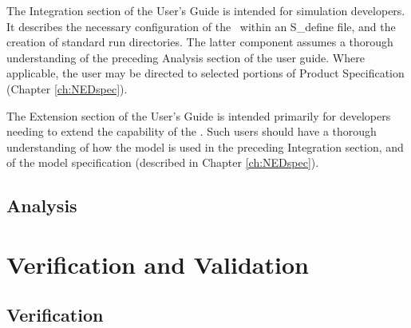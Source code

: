 The Integration section of the User's Guide is intended for simulation
developers.
It describes the necessary configuration of the \NEDDesc\
within an
S\_define file, and the creation of standard run directories.  The
latter
component assumes a thorough understanding of the preceding Analysis
section of the user guide.
Where applicable, the user may be directed to selected portions of
Product Specification (Chapter \ref{ch:NEDspec}).

The Extension section of the User's Guide is intended primarily for
developers
needing to extend the capability of the \NEDDesc.  Such users
should have a
thorough understanding of how the model is used in the preceding
Integration section, and of the model
specification (described in Chapter \ref{ch:NEDspec}).


\section{Analysis}






\chapter{Verification and
Validation}\label{ch:NEDivv}

\section{Verification}





